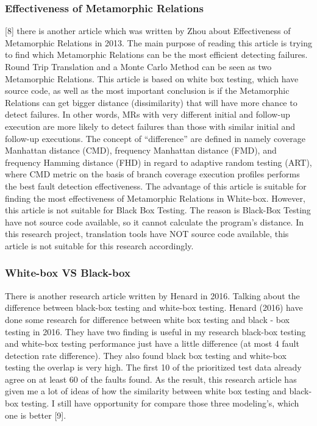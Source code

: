 \documentclass[conference,compsoc]{IEEEtran}
\begin{document}
\subsubsection{Effectiveness of Metamorphic Relations}
[8] there is another article which was written by Zhou about Effectiveness of
Metamorphic Relations in 2013. The main purpose of reading this article is
trying to find which Metamorphic Relations can be the most efficient detecting
failures. Round Trip Translation and a Monte Carlo Method can be seen as two
Metamorphic Relations. This article is based on white box testing, which have
source code, as well as the most important conclusion is if the Metamorphic
Relations can get bigger distance (dissimilarity) that will have more chance to
detect failures. In other words, MRs with very different initial and follow-up
execution are more likely to detect failures than those with similar initial and
follow-up executions. The concept of “difference” are defined in namely coverage
Manhattan distance (CMD), frequency Manhattan distance (FMD), and frequency
Hamming distance (FHD) in regard to adaptive random testing (ART), where CMD
metric on the basis of branch coverage execution profiles performs the best
fault detection effectiveness. The advantage of this article is suitable for
finding the most effectiveness of Metamorphic Relations in White-box. However,
this article is not suitable for Black Box Testing. The reason is Black-Box
Testing have not source code available, so it cannot calculate the program’s
distance. In this research project, translation tools have NOT source code
available, this article is not suitable for this research accordingly.

\subsubsection{White-box VS Black-box}
There is another research article written by Henard in 2016. Talking about the
difference between black-box testing and white-box testing. Henard (2016) have
done some research for difference between white box testing and black - box
testing in 2016. They have two finding is useful in my research black-box
testing and white-box testing performance just have a little difference (at most
4 fault detection rate difference). They also found black box testing and
white-box testing the overlap is very high. The first 10 of the prioritized test
data already agree on at least 60 of the faults found. As the result, this
research article has given me a lot of ideas of how the similarity between white
box testing and black-box testing. I still have opportunity for compare those
three modeling’s, which one is better [9].
\end{document}
